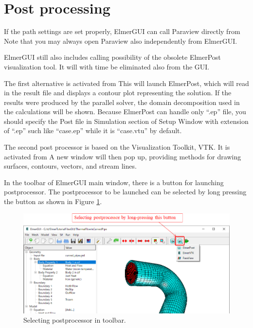 \section{Post processing}

If the path settings are set properly, ElmerGUI can call Paraview directly from
Note that you may always open Paraview also independently from ElmerGUI. 

ElmerGUI still also includes calling possibility of the obsolete ElmerPost visualization tool.
It will with time be eliminated also from the GUI. 



The first alternative is activated from
\noindent This will launch ElmerPost, which will read in the result file and displays a contour plot representing the solution. If the results were produced by the parallel solver, the domain decomposition used in the calculations will be shown. Because ElmerPost can handle only ``.ep'' file, you should specify the Post file in Simulation section of Setup Window with extension of ``.ep'' such like ``case.ep'' while it is ``case.vtu'' by default.

The second post processor is based on the Visualization Toolkit, VTK. It is activated from
\noindent A new window will then pop up, providing methods for drawing surfaces, contours,
vectors, and stream lines.

In the toolbar of ElmerGUI main window, there is a button for launching postprocessor. The postprocessor to be launched can be selected by long pressing the button as shown in Figure \ref{fig:prostprocessors}.  
\begin{figure}[htb]
	\begin{center}
		\includegraphics[scale=0.5]{images/postprocessors.png}
		\caption{Selecting postprocessor in toolbar.}
		\label{fig:prostprocessors}
	\end{center}
\end{figure}

